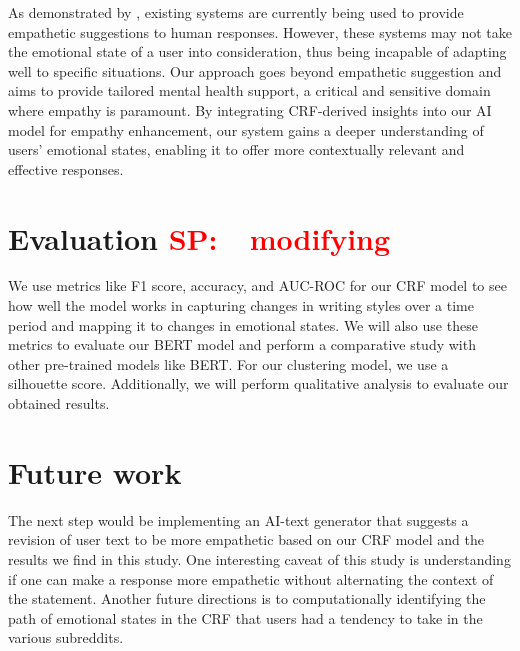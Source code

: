 \documentclass[conference,compsoc]{IEEEtran}
\newcommand{\seo}[1]{\textcolor{red}{SP:~~#1}}
\begin{document}
As demonstrated by \citet{Sharma+23:human-ai-empathic-conversation}, existing systems are currently being used to provide empathetic suggestions to human responses. However, these systems may not take the emotional state of a user into consideration, thus being incapable of adapting well to specific situations. Our approach goes beyond empathetic suggestion and aims to provide tailored mental health support, a critical and sensitive domain where empathy is paramount. By integrating CRF-derived insights into our AI model for empathy enhancement, our system gains a deeper understanding of users' emotional states, enabling it to offer more contextually relevant and effective responses.

\section{Evaluation \seo{modifying}}
We use metrics like F1 score, accuracy, and AUC-ROC for our CRF model to see how well the model works in capturing changes in writing styles over a time period and mapping it to changes in emotional states. We will also use these metrics to evaluate our BERT model and perform a comparative study with other pre-trained models like BERT. For our clustering model, we use a silhouette score. Additionally, we will  perform qualitative analysis to evaluate our obtained results. 

\section{Future work}
The next step would be implementing an AI-text generator that suggests a revision of user text to be more empathetic based on our CRF model and the results we find in this study. One interesting caveat of this study is understanding if one can make a response more empathetic without alternating the context of the statement. Another future directions is to computationally identifying the path of emotional states in the CRF that users had a tendency to take in the various subreddits.







\end{document}
